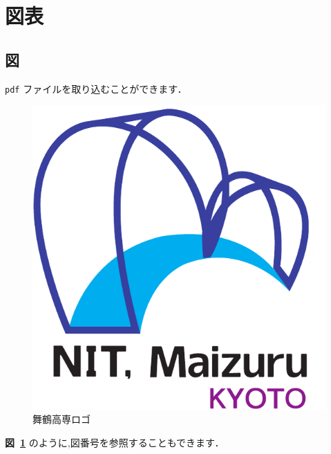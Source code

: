 
\section{図表}
\subsection{図}
\texttt{pdf} ファイルを取り込むことができます．
\begin{figure}[H]
  \centering
  \includegraphics[scale=0.5]{logo.pdf}
  \caption{舞鶴高専ロゴ}
  \label{fig:fig01}
\end{figure}
\textbf{図~\ref{fig:fig01}} のように,図番号を参照することもできます．

